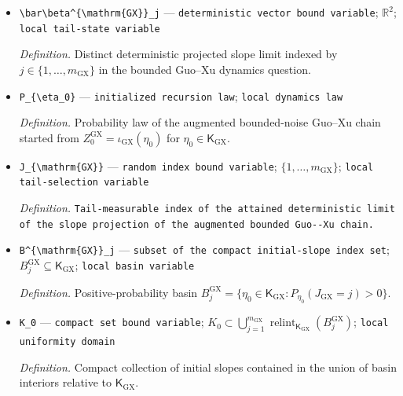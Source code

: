 \documentclass{article}
\begin{document}
\begin{itemize}
  \par\smallskip\noindent\emph{Definition.} \texttt{Number of distinct deterministic projected slope limits quantified in the bounded Guo-\allowbreak{}-\allowbreak{}Xu dynamics question.}
  \item \texttt{\textbackslash{}\allowbreak{}bar\textbackslash{}\allowbreak{}beta\textasciicircum{}\{\textbackslash{}\allowbreak{}mathrm\{GX\}\allowbreak{}\}\allowbreak{}\_\allowbreak{}j} --- \texttt{deterministic vector bound variable}; \(\mathbb R^2\); \texttt{local tail-\allowbreak{}state variable}
  \par\smallskip\noindent\emph{Definition.} Distinct deterministic projected slope limit indexed by \(j\in\{1,\ldots,m_{\mathrm{GX}}\}\) in the bounded Guo--Xu dynamics question.
  \item \texttt{P\_\allowbreak{}\{\textbackslash{}\allowbreak{}eta\_\allowbreak{}0\}\allowbreak{}} --- \texttt{initialized recursion law}; \texttt{local dynamics law}
  \par\smallskip\noindent\emph{Definition.} Probability law of the augmented bounded-noise Guo--Xu chain started from \(Z^{\mathrm{GX}}_0=\iota_{\mathrm{GX}}(\eta_0)\) for \(\eta_0\in\mathsf K_{\mathrm{GX}}\).
  \item \texttt{J\_\allowbreak{}\{\textbackslash{}\allowbreak{}mathrm\{GX\}\allowbreak{}\}\allowbreak{}} --- \texttt{random index bound variable}; \(\{1,\ldots,m_{\mathrm{GX}}\}\); \texttt{local tail-\allowbreak{}selection variable}
  \par\smallskip\noindent\emph{Definition.} \texttt{Tail-\allowbreak{}measurable index of the attained deterministic limit of the slope projection of the augmented bounded Guo-\allowbreak{}-\allowbreak{}Xu chain.}
  \item \texttt{B\textasciicircum{}\{\textbackslash{}\allowbreak{}mathrm\{GX\}\allowbreak{}\}\allowbreak{}\_\allowbreak{}j} --- \texttt{subset of the compact initial-\allowbreak{}slope index set}; \(B^{\mathrm{GX}}_j\subseteq\mathsf K_{\mathrm{GX}}\); \texttt{local basin variable}
  \par\smallskip\noindent\emph{Definition.} Positive-probability basin \(B^{\mathrm{GX}}_j=\{\eta_0\in\mathsf K_{\mathrm{GX}}:P_{\eta_0}(J_{\mathrm{GX}}=j)>0\}\).
  \item \texttt{K\_\allowbreak{}0} --- \texttt{compact set bound variable}; \(K_0\subset\bigcup_{j=1}^{m_{\mathrm{GX}}}\operatorname{relint}_{\mathsf K_{\mathrm{GX}}}(B^{\mathrm{GX}}_j)\); \texttt{local uniformity domain}
  \par\smallskip\noindent\emph{Definition.} Compact collection of initial slopes contained in the union of basin interiors relative to \(\mathsf K_{\mathrm{GX}}\).

\end{itemize}
\end{document}
